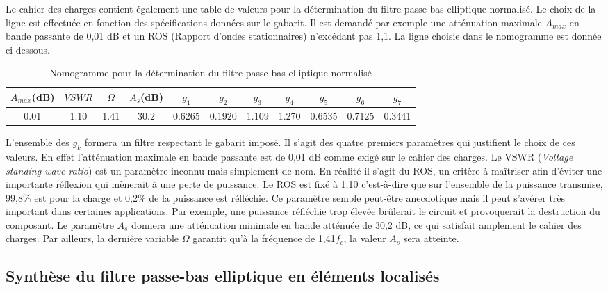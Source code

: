 \documentclass[french]{article}
\begin{document}
Le cahier des charges contient également une table de valeurs pour la détermination du filtre passe-bas elliptique normalisé. Le choix de la ligne est effectuée en fonction des spécifications données sur le gabarit. Il est demandé par exemple une atténuation maximale $A_{max}$ en bande passante de 0,01 dB et un ROS (Rapport d'ondes stationnaires) n'excédant pas 1,1. La ligne choisie dans le nomogramme est donnée ci-dessous.

\begin{table}[H]
	\centering
	\begin{tabular}{|c|c|c|c|c|c|c|c|c|c|c|}
		\hline
		$A_{max}$(dB) & $VSWR$ & $\Omega$ & $A_s$(dB) & $g_1$ & $g_2$ & $g_3$ & $g_4$ & $g_5$ & $g_6$ & $g_7$\\
		\hline
		0.01 & 1.10 & 1.41 & 30.2 & 0.6265 & 0.1920 & 1.109 & 1.270 & 0.6535 & 0.7125 & 0.3441\\
		\hline
	\end{tabular}
	\caption{Nomogramme pour la détermination du filtre passe-bas elliptique normalisé}
	\label{tab:nomogramme_elliptique}
\end{table}

L'ensemble des $g_k$ formera un filtre respectant le gabarit imposé. Il s'agit des quatre premiers paramètres qui justifient le choix de ces valeurs. En effet l'atténuation maximale en bande passante est de 0,01 dB comme exigé sur le cahier des charges. Le VSWR (\textit{Voltage standing wave ratio}) est un paramètre inconnu mais simplement de nom. En réalité il s'agit du ROS, un critère à maîtriser afin d'éviter une importante réflexion qui mènerait à une perte de puissance. Le ROS est fixé à 1,10 c'est-à-dire que sur l'ensemble de la puissance transmise, 99,8\% est pour la charge et 0,2\% de la puissance est réfléchie. Ce paramètre semble peut-être anecdotique mais il peut s'avérer très important dans certaines applications. Par exemple, une puissance réfléchie trop élevée brûlerait le circuit et provoquerait la destruction du composant. Le paramètre $A_s$ donnera une atténuation minimale en bande atténuée de 30,2 dB, ce qui satisfait amplement le cahier des charges. Par ailleurs, la dernière variable $\Omega$ garantit qu'à la fréquence de 1,41$f_c$, la valeur $A_s$ sera atteinte.

\newpage

\subsection{Synthèse du filtre passe-bas elliptique en éléments localisés}
\end{document}
